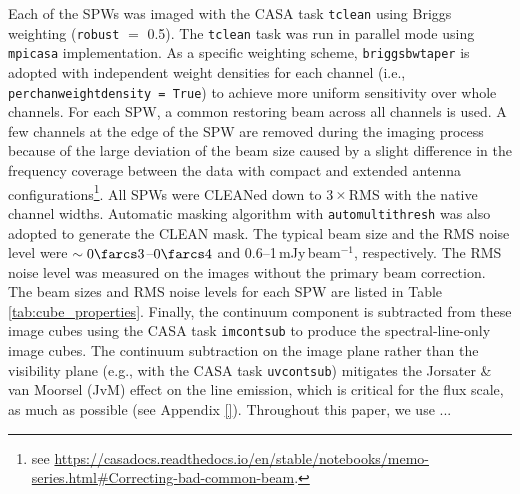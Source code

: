 \documentclass[linenumbers, twocolumn, times]{aastex631}
\begin{document}
Each of the SPWs was imaged with the CASA task \texttt{tclean} \citep{Hogbom1974} using Briggs weighting (\texttt{robust} $=$ 0.5). The \texttt{tclean} task was run in parallel mode using \texttt{mpicasa} implementation. As a specific weighting scheme, \texttt{briggsbwtaper} is adopted with independent weight densities for each channel (i.e., \texttt{perchanweightdensity = True}) to achieve more uniform sensitivity over whole channels. For each SPW, a common restoring beam across all channels is used. A few channels at the edge of the SPW are removed during the imaging process because of the large deviation of the beam size caused by a slight difference in the frequency coverage between the data with compact and extended antenna configurations\footnote{see \url{https://casadocs.readthedocs.io/en/stable/notebooks/memo-series.html\#Correcting-bad-common-beam}.}. All SPWs were CLEANed down to 3\,$\times$\,RMS with the native channel widths. Automatic masking algorithm with \texttt{automultithresh} was also adopted to generate the CLEAN mask. The typical beam size and the RMS noise level were $\sim0\farcs3$--$0\farcs4$ and 0.6--1\,mJy\,beam$^{-1}$, respectively. The RMS noise level was measured on the images without the primary beam correction. The beam sizes and RMS noise levels for each SPW are listed in Table \ref{tab:cube_properties}. Finally, the continuum component is subtracted from these image cubes using the CASA task \texttt{imcontsub} to produce the spectral-line-only image cubes. The continuum subtraction on the image plane rather than the visibility plane (e.g., with the CASA task \texttt{uvcontsub}) mitigates the Jorsater \& van Moorsel (JvM) effect \citep{JvM, Czekala2021} on the line emission, which is critical for the flux scale, as much as possible (see Appendix \ref{}). Throughout this paper, we use ...
\end{document}
